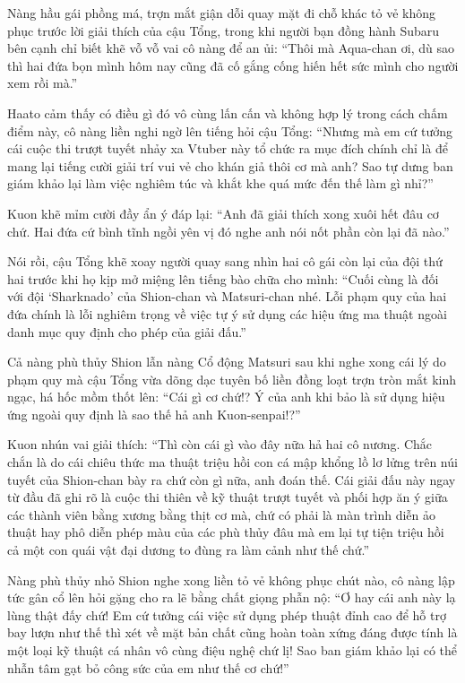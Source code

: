 \documentclass[../main.tex]{subfiles}
\begin{document}
Nàng hầu gái phồng má, trợn mắt giận dỗi quay mặt đi chỗ khác tỏ vẻ không phục trước lời giải thích của cậu Tổng, trong khi người bạn đồng hành Subaru bên cạnh chỉ biết khẽ vỗ vỗ vai cô nàng để an ủi: ``Thôi mà Aqua-chan ơi, dù sao thì hai đứa bọn mình hôm nay cũng đã cố gắng cống hiến hết sức mình cho người xem rồi mà.''

Haato cảm thấy có điều gì đó vô cùng lấn cấn và không hợp lý trong cách chấm điểm này, cô nàng liền nghi ngờ lên tiếng hỏi cậu Tổng: ``Nhưng mà em cứ tưởng cái cuộc thi trượt tuyết nhảy xa Vtuber này tổ chức ra mục đích chính chỉ là để mang lại tiếng cười giải trí vui vẻ cho khán giả thôi cơ mà anh? Sao tự dưng ban giám khảo lại làm việc nghiêm túc và khắt khe quá mức đến thế làm gì nhỉ?''

Kuon khẽ mỉm cười đầy ẩn ý đáp lại: ``Anh đã giải thích xong xuôi hết đâu cơ chứ. Hai đứa cứ bình tĩnh ngồi yên vị đó nghe anh nói nốt phần còn lại đã nào.''

Nói rồi, cậu Tổng khẽ xoay người quay sang nhìn hai cô gái còn lại của đội thứ hai trước khi họ kịp mở miệng lên tiếng bào chữa cho mình: ``Cuối cùng là đối với đội `Sharknado' của Shion-chan và Matsuri-chan nhé. Lỗi phạm quy của hai đứa chính là lỗi nghiêm trọng về việc tự ý sử dụng các hiệu ứng ma thuật ngoài danh mục quy định cho phép của giải đấu.''

Cả nàng phù thủy Shion lẫn nàng Cổ động Matsuri sau khi nghe xong cái lý do phạm quy mà cậu Tổng vừa dõng dạc tuyên bố liền đồng loạt trợn tròn mắt kinh ngạc, há hốc mồm thốt lên: ``Cái gì cơ chứ!? Ý của anh khi bảo là sử dụng hiệu ứng ngoài quy định là sao thế hả anh Kuon-senpai!?''

Kuon nhún vai giải thích: ``Thì còn cái gì vào đây nữa hả hai cô nương. Chắc chắn là do cái chiêu thức ma thuật triệu hồi con cá mập khổng lồ lơ lửng trên núi tuyết của Shion-chan bày ra chứ còn gì nữa, anh đoán thế. Cái giải đấu này ngay từ đầu đã ghi rõ là cuộc thi thiên về kỹ thuật trượt tuyết và phối hợp ăn ý giữa các thành viên bằng xương bằng thịt cơ mà, chứ có phải là màn trình diễn ảo thuật hay phô diễn phép màu của các phù thủy đâu mà em lại tự tiện triệu hồi cả một con quái vật đại dương to đùng ra làm cảnh như thế chứ.''

Nàng phù thủy nhỏ Shion nghe xong liền tỏ vẻ không phục chút nào, cô nàng lập tức gân cổ lên hỏi gặng cho ra lẽ bằng chất giọng phẫn nộ: ``Ơ hay cái anh này lạ lùng thật đấy chứ! Em cứ tưởng cái việc sử dụng phép thuật đỉnh cao để hỗ trợ bay lượn như thế thì xét về mặt bản chất cũng hoàn toàn xứng đáng được tính là một loại kỹ thuật cá nhân vô cùng điệu nghệ chứ lị! Sao ban giám khảo lại có thể nhẫn tâm gạt bỏ công sức của em như thế cơ chứ!''
\end{document}
